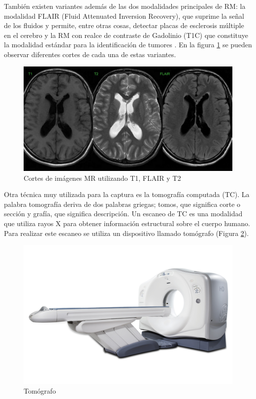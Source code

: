 También existen variantes además de las dos modalidades principales de RM: la modalidad FLAIR (Fluid Attenuated Inversion Recovery), que suprime la señal de los fluidos y permite, entre otras cosas, detectar placas de esclerosis múltiple en el cerebro y la RM con realce de contraste de Gadolinio (T1C) que constituye la modalidad estándar para la identificación de tumores \cite{scarabino2012imaging}. En la figura \ref{fig:mri_cortes} se pueden observar diferentes cortes de cada una de estas variantes.

\begin{figure}[H]
\centering
\includegraphics[scale=0.2]{images/t1_t2_flair.jpg}
\caption{Cortes de imágenes MR utilizando T1, FLAIR y T2}
\label{fig:mri_cortes}
\end{figure}

Otra técnica muy utilizada para la captura es la tomografía computada (TC). La palabra tomografía deriva de dos palabras griegas; tomos, que significa corte o sección y grafía, que significa descripción. Un escaneo de TC es una modalidad que utiliza rayos X para obtener información estructural sobre el cuerpo humano. Para realizar este escaneo se utiliza un dispositivo llamado tomógrafo (Figura \ref{fig:tomografo}).

\begin{figure}[H]
\centering
\includegraphics[scale=0.5]{images/ge_ct_scanner.jpg}
\caption{Tomógrafo}
\label{fig:tomografo}
\end{figure}

